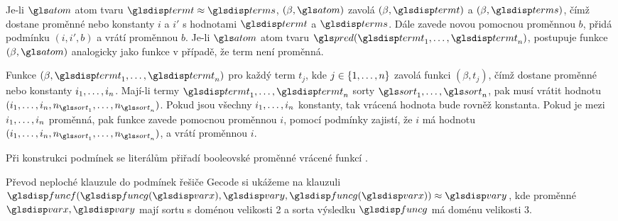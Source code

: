 {Je-li $\atom$ atom tvaru $\term \approx \termS$,
\VarForAtom$(\beta, \atom)$
zavolá \TermValue$(\beta, \term)$
a \TermValue$(\beta, \termS)$, čímž dostane
proměnné nebo konstanty $i$ a $i'$ s hodnotami $\term$ a $\termS$.
Dále \VarForAtom{} zavede novou pomocnou proměnnou $b$,
přidá podmínku \Eq$(i, i', b)$ a vrátí proměnnou $b$.
Je-li $\atom$ atom tvaru $\pred(\term_1 \comdots \term_n)$,
postupuje funkce \VarForAtom$(\beta, \atom)$
analogicky jako funkce \TermValue{} v případě,
že term není proměnná.

Funkce \Index$(\beta, \term_1 \comdots \term_n)$
pro každý term $t_j$, kde $j \in \{ 1 , \ldots, n \}$ zavolá funkci
\TermValue$(\beta, t_j)$, čímž dostane proměnné
nebo konstanty $i_1 , \ldots, i_n$.
Mají-li termy $\term_1 \comdots \term_n$ sorty $\sort_1 \comdots \sort_n$,
pak \Index{} musí vrátit hodnotu
\Horner$(i_1 \comdots i_n, n_{\sort_1} \comdots n_{\sort_n})$.
Pokud jsou všechny $i_1 , \ldots, i_n$ konstanty,
tak vrácená hodnota bude rovněž konstanta. Pokud je mezi
$i_1 , \ldots, i_n$ proměnná, pak funkce \Index{}
zavede pomocnou proměnnou $i$, pomocí podmínky \Linear{} zajistí,
že $i$ má hodnotu
\Horner$(i_1 \comdots i_n, n_{\sort_1} \comdots n_{\sort_n})$,
a vrátí proměnnou $i$.

Při konstrukci podmínek \Clause{} se literálům přiřadí
booleovské proměnné vrácené funkcí \VarForAtom.

Převod neploché klauzule do podmínek řešiče Gecode si ukážeme na
klauzuli $\func(\funcG(\var), \varY, \funcG(\var)) \approx \varY$,
kde proměnné $\var, \varY$ mají sortu s doménou velikosti 2 a
sorta výsledku $\funcG$ má doménu velikosti 3.

}
